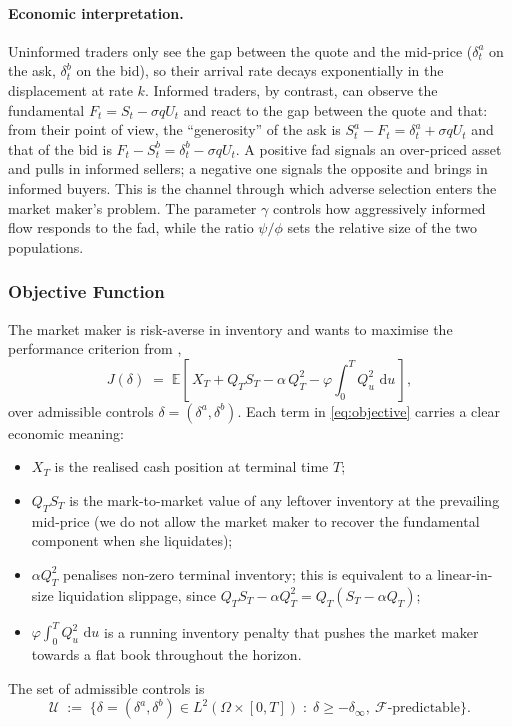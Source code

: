 \documentclass[11pt,a4paper]{article}
\theoremstyle{plain}
\theoremstyle{definition}
\newcommand{\E}{\mathbb{E}}
\newcommand{\F}{\mathcal{F}}
\newcommand{\dd}{\,\mathrm{d}}
\begin{document}
\paragraph{Economic interpretation.}
Uninformed traders only see the gap between the quote and the mid-price
($\delta^a_t$ on the ask, $\delta^b_t$ on the bid), so their arrival rate
decays exponentially in the displacement at rate $k$. Informed traders, by
contrast, can observe the fundamental $F_t = S_t-\sigma q U_t$ and react
to the gap between the quote and that: from their point of view,
the ``generosity'' of the ask is $S^a_t-F_t = \delta^a_t + \sigma q U_t$
and that of the bid is $F_t-S^b_t = \delta^b_t - \sigma q U_t$. A positive
fad signals an over-priced asset and pulls in informed sellers; a negative
one signals the opposite and brings in informed buyers. This is the channel
through which adverse selection enters the market maker's problem. The
parameter $\gamma$ controls how aggressively informed flow responds to the
fad, while the ratio $\psi/\phi$ sets the relative size of the two
populations.

\subsubsection{Objective Function}

The market maker is risk-averse in inventory and wants to maximise the
performance criterion from \cite{cartea2015algorithmic},
\begin{equation}
\label{eq:objective}
  J(\delta) \;=\; \E\!\left[\,X_T + Q_T S_T - \alpha\,Q_T^2
        - \varphi\!\int_0^T Q_u^2\,\dd u \,\right],
\end{equation}
over admissible controls $\delta=(\delta^a,\delta^b)$. Each term in
\eqref{eq:objective} carries a clear economic meaning:
\begin{itemize}[noitemsep]
  \item $X_T$ is the realised cash position at terminal time $T$;
  \item $Q_T S_T$ is the mark-to-market value of any leftover inventory at
        the prevailing mid-price (we do not allow the market maker to
        recover the fundamental component when she liquidates);
  \item $\alpha Q_T^2$ penalises non-zero terminal inventory; this is equivalent to a linear-in-size liquidation slippage, since
        $Q_T S_T - \alpha Q_T^2 = Q_T(S_T - \alpha Q_T)$;
  \item $\varphi\int_0^T Q_u^2\,\dd u$ is a running inventory penalty
        that pushes the market maker towards a flat book throughout the
        horizon.
\end{itemize}
The set of admissible controls is
\[
  \mathcal{U} \;:=\;
  \bigl\{\delta=(\delta^a,\delta^b)\in L^2(\Omega\times[0,T])\;:\;
        \delta\ge -\delta_\infty,\ \F\text{-predictable}\bigr\}.
\]
\end{document}
